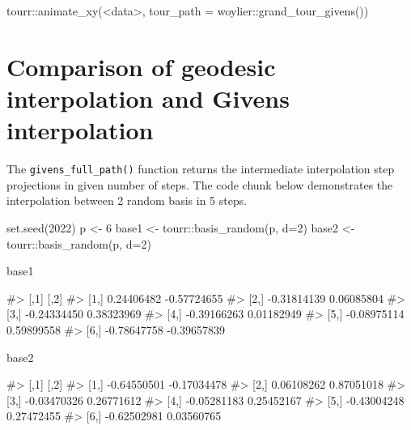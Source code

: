 \begin{Schunk}
\begin{Sinput}
tourr::animate_xy(<data>, tour_path = woylier::grand_tour_givens())
\end{Sinput}
\end{Schunk}

\hypertarget{comparison-of-geodesic-interpolation-and-givens-interpolation}{%
\section{Comparison of geodesic interpolation and Givens
interpolation}\label{comparison-of-geodesic-interpolation-and-givens-interpolation}}

The \texttt{givens\_full\_path()} function returns the intermediate
interpolation step projections in given number of steps. The code chunk
below demonstrates the interpolation between 2 random basis in 5 steps.

\begin{Schunk}
\begin{Sinput}
set.seed(2022)
p <- 6
base1 <- tourr::basis_random(p, d=2)
base2 <- tourr::basis_random(p, d=2)

base1
\end{Sinput}
\begin{Soutput}
#>             [,1]        [,2]
#> [1,]  0.24406482 -0.57724655
#> [2,] -0.31814139  0.06085804
#> [3,] -0.24334450  0.38323969
#> [4,] -0.39166263  0.01182949
#> [5,] -0.08975114  0.59899558
#> [6,] -0.78647758 -0.39657839
\end{Soutput}
\begin{Sinput}
base2
\end{Sinput}
\begin{Soutput}
#>             [,1]        [,2]
#> [1,] -0.64550501 -0.17034478
#> [2,]  0.06108262  0.87051018
#> [3,] -0.03470326  0.26771612
#> [4,] -0.05281183  0.25452167
#> [5,] -0.43004248  0.27472455
#> [6,] -0.62502981  0.03560765
\end{Soutput}
\end{Schunk}

